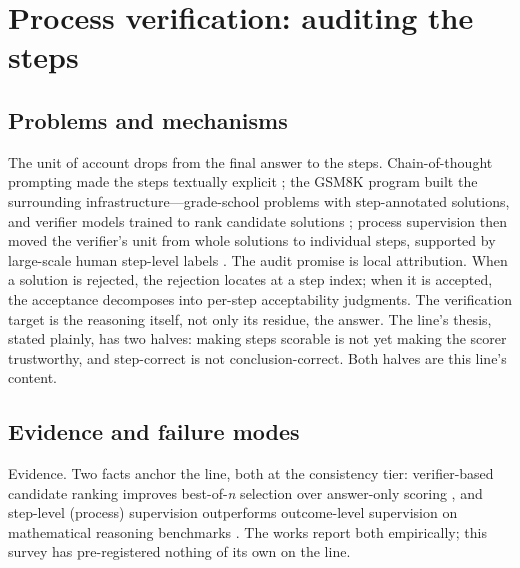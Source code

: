 \documentclass[11pt,a4paper]{article}
\begin{document}
\section{Process verification: auditing the steps}

\subsection{Problems and mechanisms}

The unit of account drops from the final answer to the steps. Chain-of-thought prompting made the steps textually explicit \cite{key01}; the GSM8K program built the surrounding infrastructure—grade-school problems with step-annotated solutions, and verifier models trained to rank candidate solutions \cite{key05}; process supervision then moved the verifier's unit from whole solutions to individual steps, supported by large-scale human step-level labels \cite{key06}. The audit promise is local attribution. When a solution is rejected, the rejection locates at a step index; when it is accepted, the acceptance decomposes into per-step acceptability judgments. The verification target is the reasoning itself, not only its residue, the answer. The line's thesis, stated plainly, has two halves: making steps scorable is not yet making the scorer trustworthy, and step-correct is not conclusion-correct. Both halves are this line's content.

\subsection{Evidence and failure modes}

Evidence. Two facts anchor the line, both at the consistency tier: verifier-based candidate ranking improves best-of-\textit{n} selection over answer-only scoring \cite{key05}, and step-level (process) supervision outperforms outcome-level supervision on mathematical reasoning benchmarks \cite{key06}. The works report both empirically; this survey has pre-registered nothing of its own on the line.
\end{document}
